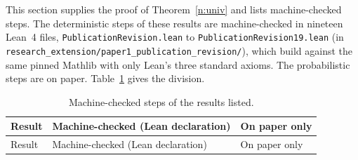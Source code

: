 \documentclass[12pt]{article}
\theoremstyle{definition}
\theoremstyle{remark}
\begin{document}
This section supplies the proof of Theorem~\ref{n:univ} and lists machine-checked steps. The deterministic steps of these results are machine-checked in nineteen Lean~4 files, \nolinkurl{PublicationRevision.lean} to \nolinkurl{PublicationRevision19.lean} (in \nolinkurl{research_extension/paper1_publication_revision/}), which build against the same pinned Mathlib with only Lean's three standard axioms. The probabilistic steps are on paper. Table~\ref{tab:newlean} gives the division.
{\footnotesize
\begin{longtable}{>{\raggedright\arraybackslash}p{}>{\raggedright\arraybackslash}p{}>{\raggedright\arraybackslash}p{}}
\caption{Machine-checked steps of the results listed.}\label{tab:newlean}\\
\toprule
Result & Machine-checked (Lean declaration) & On paper only\\\midrule
\endfirsthead
\toprule
Result & Machine-checked (Lean declaration) & On paper only\\\midrule
\endhead


\end{longtable}}
\end{document}

